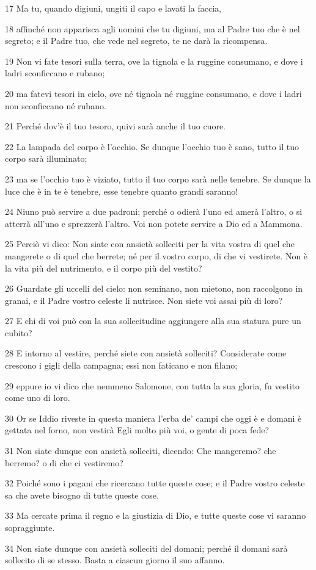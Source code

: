 \par 17 Ma tu, quando digiuni, ungiti il capo e lavati la faccia,
\par 18 affinché non apparisca agli uomini che tu digiuni, ma al Padre tuo che è nel segreto; e il Padre tuo, che vede nel segreto, te ne darà la ricompensa.
\par 19 Non vi fate tesori sulla terra, ove la tignola e la ruggine consumano, e dove i ladri sconficcano e rubano;
\par 20 ma fatevi tesori in cielo, ove né tignola né ruggine consumano, e dove i ladri non sconficcano né rubano.
\par 21 Perché dov'è il tuo tesoro, quivi sarà anche il tuo cuore.
\par 22 La lampada del corpo è l'occhio. Se dunque l'occhio tuo è sano, tutto il tuo corpo sarà illuminato;
\par 23 ma se l'occhio tuo è viziato, tutto il tuo corpo sarà nelle tenebre. Se dunque la luce che è in te è tenebre, esse tenebre quanto grandi saranno!
\par 24 Niuno può servire a due padroni; perché o odierà l'uno ed amerà l'altro, o si atterrà all'uno e sprezzerà l'altro. Voi non potete servire a Dio ed a Mammona.
\par 25 Perciò vi dico: Non siate con ansietà solleciti per la vita vostra di quel che mangerete o di quel che berrete; né per il vostro corpo, di che vi vestirete. Non è la vita più del nutrimento, e il corpo più del vestito?
\par 26 Guardate gli uccelli del cielo: non seminano, non mietono, non raccolgono in granai, e il Padre vostro celeste li nutrisce. Non siete voi assai più di loro?
\par 27 E chi di voi può con la sua sollecitudine aggiungere alla sua statura pure un cubito?
\par 28 E intorno al vestire, perché siete con ansietà solleciti? Considerate come crescono i gigli della campagna; essi non faticano e non filano;
\par 29 eppure io vi dico che nemmeno Salomone, con tutta la sua gloria, fu vestito come uno di loro.
\par 30 Or se Iddio riveste in questa maniera l'erba de' campi che oggi è e domani è gettata nel forno, non vestirà Egli molto più voi, o gente di poca fede?
\par 31 Non siate dunque con ansietà solleciti, dicendo: Che mangeremo? che berremo? o di che ci vestiremo?
\par 32 Poiché sono i pagani che ricercano tutte queste cose; e il Padre vostro celeste sa che avete bisogno di tutte queste cose.
\par 33 Ma cercate prima il regno e la giustizia di Dio, e tutte queste cose vi saranno sopraggiunte.
\par 34 Non siate dunque con ansietà solleciti del domani; perché il domani sarà sollecito di se stesso. Basta a ciascun giorno il suo affanno.

